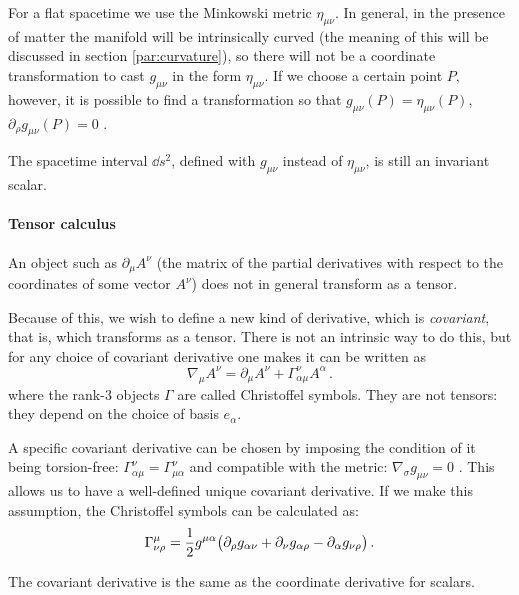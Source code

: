 \documentclass[main.tex]{subfiles}
\begin{document}
For a flat spacetime we use the Minkowski metric \(\eta_{\mu\nu}\). In general, in the presence of matter the manifold will be intrinsically curved (the meaning of this will be discussed in section \ref{par:curvature}), so there will not be a coordinate transformation to cast \(g_{\mu\nu}\) in the form \(\eta_{\mu\nu}\). If we choose a certain point \(P\), however, it is possible to find a transformation so that \(g_{\mu\nu}(P)=\eta_{\mu\nu}(P)\), \(\partial_\rho g_{\mu\nu}(P) = 0\) \cite[pages 49--50]{Carroll:1997ar}.

The spacetime interval \(\dd{s}^2\), defined with \(g_{\mu\nu}\) instead of \(\eta_{\mu\nu}\), is still an invariant scalar.

\paragraph{Tensor calculus}

An object such as \(\partial_\mu A^\nu\) (the matrix of the partial derivatives with respect to the coordinates of some vector \(A^\nu\)) does not in general transform as a tensor.

Because of this, we wish to define a new kind of derivative, which is \emph{covariant}, that is, which transforms as a tensor. There is not an intrinsic way to do this, but for any choice of covariant derivative one makes it can be written as
\begin{equation}
    \nabla_\mu A^\nu = \partial_\mu A^\nu + \Gamma^\nu _{\alpha \mu}  A^\alpha \,.
\end{equation}
%
where the rank-3 objects $\Gamma$ are called Christoffel symbols.
They are not tensors: they depend on the choice of basis $e_\alpha$.

A specific covariant derivative can be chosen by imposing the condition of it being torsion-free: $\Gamma^\nu_{\alpha \mu} = \Gamma ^\nu _{\mu \alpha}$ and compatible with the metric: \(\nabla_\sigma g_{\mu\nu} = 0\) . This allows us to have a well-defined unique covariant derivative. If we make this assumption, the Christoffel symbols can be calculated as:
%
\begin{equation}  \label{eq:christoffel-symbols-from-metric}
    \Gamma^\mu_{\nu \rho} = \frac{1}{2} g^{\mu \alpha} \qty(
    \partial_\rho g_{\alpha \nu} +
    \partial_\nu g_{\alpha \rho} -
    \partial_\alpha g_{\nu \rho}
    )\,.
\end{equation}

The covariant derivative is the same as the coordinate derivative for scalars.
\end{document}
